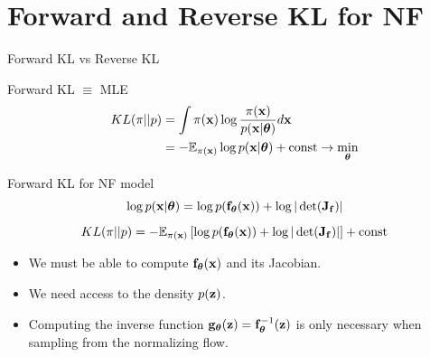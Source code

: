 \documentclass{beamer}
\begin{document}
\section{Forward and Reverse KL for NF}
\begin{frame}{Forward KL vs Reverse KL}
	\begin{block}{Forward KL $\equiv$ MLE}
		\vspace{-0.5cm}
		\begin{align*}
			KL(\pi || p) &= \int \pi (\mathbf{x}) \log \frac{\pi(\mathbf{x})}{p(\mathbf{x} | \boldsymbol{\theta})} d \mathbf{x} \\
			&= - \mathbb{E}_{\pi(\mathbf{x})} \log p(\mathbf{x} | \boldsymbol{\theta}) + \text{const} \rightarrow \min_{\boldsymbol{\theta}}
		\end{align*}
	\end{block}
	\begin{block}{Forward KL for NF model}
	    \vspace{-0.1cm}
		\[
			\log p(\mathbf{x}|\boldsymbol{\theta}) = \log p(\mathbf{f}_{\boldsymbol{\theta}}(\mathbf{x})) + \log  |\det (\mathbf{J}_{\mathbf{f}})|
		\]		
		\[
			KL(\pi || p)  = - \mathbb{E}_{\pi(\mathbf{x})} \left[\log p(\mathbf{f}_{\boldsymbol{\theta}}(\mathbf{x})) + \log  |\det (\mathbf{J}_{\mathbf{f}})|\right] + \text{const} 
		\]
		\vspace{-0.2cm}
		\begin{itemize}
			\item We must be able to compute $\mathbf{f}_{\boldsymbol{\theta}}(\mathbf{x})$ and its Jacobian.
			\item We need access to the density $p(\mathbf{z})$.
			\item Computing the inverse function $\mathbf{g}_{\boldsymbol{\theta}}(\mathbf{z}) = \mathbf{f}^{-1}_{\boldsymbol{\theta}}(\mathbf{z})$ is only necessary when sampling from the normalizing flow.
		\end{itemize}
	\end{block}
\end{frame}
\end{document}
